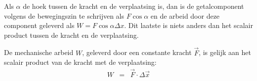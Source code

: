 \documentclass{ximera}
\begin{document}
	Als $\alpha$ de hoek tussen de kracht en de verplaatsing is, dan is de getalcomponent volgens de bewegingszin te schrijven als $F\cos{\alpha}$ en de arbeid door deze component geleverd als $W=F\cos{\alpha}\Delta x$. Dit laatste is niets anders dan het scalair product tussen de kracht en de verplaatsing.
	
	De mechanische arbeid $W$, geleverd door een constante kracht $\vec{F}$, is gelijk aan het scalair product van de kracht met de verplaatsing:
	\begin{eqnarray}
	W&=&\vec{F}\cdot\Delta\vec{x}\label{def_arbeid_cste_kracht}
	\end{eqnarray}
	
	
	
	
	
\end{document}
